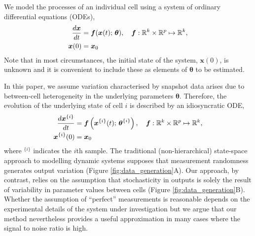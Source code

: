 We model the processes of an individual cell using a system of ordinary differential equations (ODEs), %
%
\begin{equation}\label{eq:ode}
\begin{aligned}
\frac{d\boldsymbol{x}}{dt} &= \boldsymbol{f}(\boldsymbol{x}(t); \, \boldsymbol{\theta}), \quad \boldsymbol{f}: \mathbb{R}^k \times \mathbb{R}^p \mapsto \mathbb{R}^k, \\
\boldsymbol{x}(0) &= \boldsymbol{x}_0
\end{aligned}
\end{equation}
%
Note that in most circumstances, the initial state of the system, $\boldsymbol{x}(0)$, is unknown and it is convenient to include these as elements of $\boldsymbol{\theta}$ to be estimated. %

In this paper, we assume variation characterised by snapshot data arises due to between-cell heterogeneity in the underlying parameters $\boldsymbol{\theta}$. Therefore, the evolution of the underlying state of cell $i$ is described by an idiosyncratic ODE,
%
\begin{equation} \label{eq:ode_i}
\begin{aligned}
\frac{d\boldsymbol{x}^{\{i\}}}{dt} &= \boldsymbol{f} \left( \boldsymbol{x}^{\{i\}}(t); \, \boldsymbol{\theta}^{\{i\}} \right), 
                                      \quad \boldsymbol{f}: \mathbb{R}^k \times \mathbb{R}^p \mapsto \mathbb{R}^k, \\
\boldsymbol{x}^{\{i\}}(0) &= \boldsymbol{x}_0
\end{aligned}
\end{equation}
where $^{\{i\}}$ indicates the $i$th sample.
%
The traditional (non-hierarchical) state-space approach to modelling dynamic systems supposes that measurement randomness generates output variation (Figure \ref{fig:data_generation}A). Our approach, by contrast, relies on the assumption that stochasticity in outputs is solely the result of variability in parameter values between cells (Figure \ref{fig:data_generation}B). Whether the assumption of ``perfect'' measurements is reasonable depends on the experimental details of  the system under investigation but we argue that our method nevertheless provides a useful approximation in many cases where the signal to noise ratio is high.

